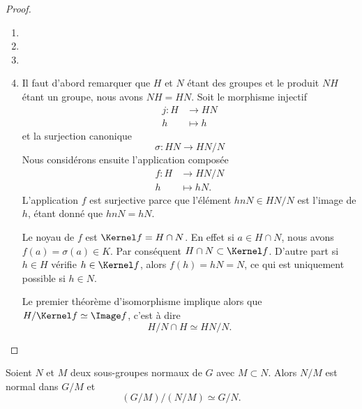 \begin{proof}
    \begin{enumerate}
        \item
        \item
        \item
        \item
            Il faut d'abord remarquer que \( H\) et \( N\) étant des groupes et le produit \( NH\) étant un groupe, nous avons \( NH=HN\). Soit le morphisme injectif
            \begin{equation}
                \begin{aligned}
                    j\colon H&\to HN \\
                    h&\mapsto h
                \end{aligned}
            \end{equation}
            et la surjection canonique
            \begin{equation}
                \sigma\colon HN\to HN/N 
            \end{equation}
            Nous considérons ensuite l'application composée
            \begin{equation}
                \begin{aligned}
                    f\colon H&\to HN/N \\
                    h&\mapsto hN. 
                \end{aligned}
            \end{equation}
            L'application \( f\) est surjective parce que l'élément \( hnN\in HN/N\) est l'image de \( h\), étant donné que \( hnN=hN\).

            Le noyau de \( f\) est \( \Kernel f=H\cap N\). En effet si \( a\in H\cap N\), nous avons \( f(a)=\sigma(a)\in K\). Par conséquent \( H\cap N\subset \Kernel f\). D'autre part si \( h\in H\) vérifie \( h\in\Kernel f\), alors \( f(h)=hN=N\), ce qui est uniquement possible si \( h\in N\).

            Le premier théorème d'isomorphisme implique alors que \( H/\Kernel f\simeq \Image f\), c'est à dire
            \begin{equation}
                H/N\cap H\simeq HN/N.
            \end{equation}
    \end{enumerate}
\end{proof}

\begin{theorem}  \label{ThoezgBep}
    Soient \( N\) et \( M\) deux sous-groupes normaux de \( G\) avec \( M\subset N\). Alors \( N/M\) est normal dans \( G/M\) et
    \begin{equation}
        (G/M)/(N/M)\simeq G/N.
    \end{equation}
\end{theorem}

